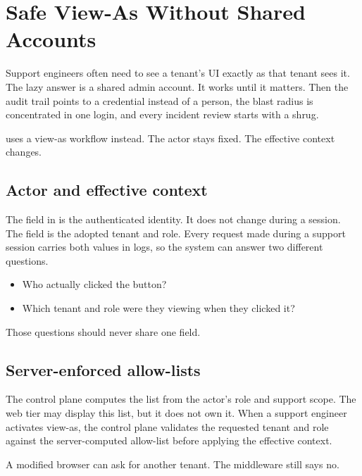 \section{Safe View-As Without Shared Accounts}
\label{sec:impersonation}

Support engineers often need to see a tenant's UI exactly as that tenant sees it. The lazy answer is a shared admin account. It works until it matters. Then the audit trail points to a credential instead of a person, the blast radius is concentrated in one login, and every incident review starts with a shrug.

\system{} uses a view-as workflow instead. The actor stays fixed. The effective context changes.

\subsection{Actor and effective context}
\label{sec:actor_context}

The  field in  is the authenticated identity. It does not change during a session. The  field is the adopted tenant and role. Every request made during a support session carries both values in logs, so the system can answer two different questions.

\begin{itemize}
  \item Who actually clicked the button?
  \item Which tenant and role were they viewing when they clicked it?
\end{itemize}

Those questions should never share one field.

\subsection{Server-enforced allow-lists}
\label{sec:allowlists}

The control plane computes the  list from the actor's role and support scope. The web tier may display this list, but it does not own it. When a support engineer activates view-as, the control plane validates the requested tenant and role against the server-computed allow-list before applying the effective context.

A modified browser can ask for another tenant. The middleware still says no.

